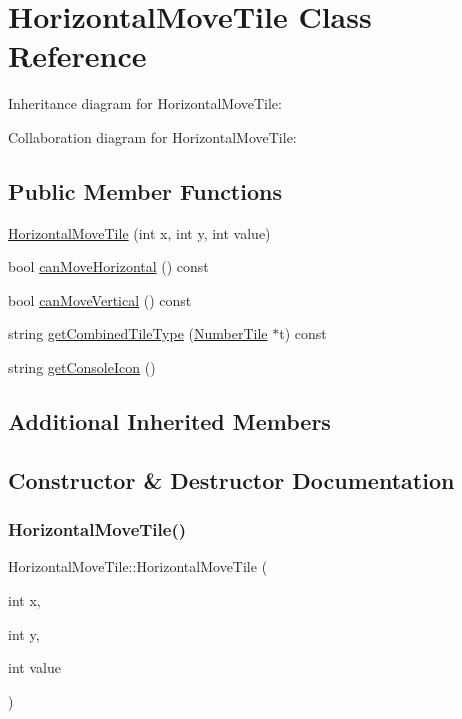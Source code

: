 \hypertarget{classHorizontalMoveTile}{}\section{Horizontal\+Move\+Tile Class Reference}
\label{classHorizontalMoveTile}


Inheritance diagram for Horizontal\+Move\+Tile\+:


Collaboration diagram for Horizontal\+Move\+Tile\+:
\subsection*{Public Member Functions}
\begin{DoxyCompactItemize}
\item 
\hyperlink{classHorizontalMoveTile_abdfd0dd3b6c36f08923c4fb84703c395}{Horizontal\+Move\+Tile} (int x, int y, int value)
\item 
bool \hyperlink{classHorizontalMoveTile_a28190ca8a5b31cc9a0e5de65aa8f1e24}{can\+Move\+Horizontal} () const
\item 
bool \hyperlink{classHorizontalMoveTile_abd31838d18114a797dd84d47bae574c2}{can\+Move\+Vertical} () const
\item 
string \hyperlink{classHorizontalMoveTile_a90f17bebf2e3eb4ccdf20cd9b5c2bab6}{get\+Combined\+Tile\+Type} (\hyperlink{classNumberTile}{Number\+Tile} $\ast$t) const
\item 
string \hyperlink{classHorizontalMoveTile_a54bd2825da287bde0e9d1ab589c6af19}{get\+Console\+Icon} ()
\end{DoxyCompactItemize}
\subsection*{Additional Inherited Members}


\subsection{Constructor \& Destructor Documentation}
\mbox{\label{classHorizontalMoveTile_abdfd0dd3b6c36f08923c4fb84703c395}} 
\subsubsection{\texorpdfstring{Horizontal\+Move\+Tile()}{HorizontalMoveTile()}}
{\footnotesize\ttfamily Horizontal\+Move\+Tile\+::\+Horizontal\+Move\+Tile (\begin{DoxyParamCaption}\item[{int}]{x,  }\item[{int}]{y,  }\item[{int}]{value }\end{DoxyParamCaption})}


